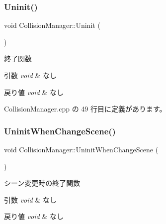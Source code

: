 \mbox{\label{class_collision_manager_abfa4b87f3ce102f0d173e112e7963f09}} 
\subsubsection{\texorpdfstring{Uninit()}{Uninit()}}
{\footnotesize\ttfamily void Collision\+Manager\+::\+Uninit (\begin{DoxyParamCaption}{ }\end{DoxyParamCaption})}



終了関数 


\begin{DoxyParams}{引数}
{\em void} & なし \\
\hline
\end{DoxyParams}

\begin{DoxyRetVals}{戻り値}
{\em void} & なし \\
\hline
\end{DoxyRetVals}


 Collision\+Manager.\+cpp の 49 行目に定義があります。

\mbox{\label{class_collision_manager_a33ce56b5a6f68d71b0f2bf733413dddb}} 
\subsubsection{\texorpdfstring{Uninit\+When\+Change\+Scene()}{UninitWhenChangeScene()}}
{\footnotesize\ttfamily void Collision\+Manager\+::\+Uninit\+When\+Change\+Scene (\begin{DoxyParamCaption}{ }\end{DoxyParamCaption})}



シーン変更時の終了関数 


\begin{DoxyParams}{引数}
{\em void} & なし \\
\hline
\end{DoxyParams}

\begin{DoxyRetVals}{戻り値}
{\em void} & なし \\
\hline
\end{DoxyRetVals}


